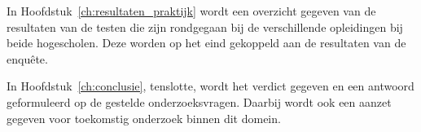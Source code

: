 In Hoofdstuk~\ref{ch:resultaten_praktijk} wordt een overzicht gegeven van de resultaten van de testen die zijn rondgegaan bij de verschillende opleidingen bij beide hogescholen. Deze worden op het eind gekoppeld aan de resultaten van de enquête. 

In Hoofdstuk~\ref{ch:conclusie}, tenslotte, wordt het verdict gegeven en een antwoord geformuleerd op de gestelde onderzoeksvragen. Daarbij wordt ook een aanzet gegeven voor toekomstig onderzoek binnen dit domein.

